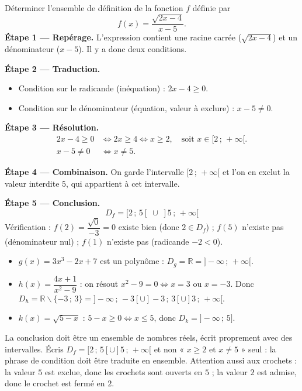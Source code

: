 \documentclass[11pt]{article}
\def\setminus{\mathbin{\backslash}}\let\smallsetminus\setminus
\begin{document}
\begin{exoresolu}
Déterminer l'ensemble de définition de la fonction $f$ définie par
\[ f(x) = \dfrac{\sqrt{2x - 4}}{x - 5}. \]
\tcblower
\textbf{Étape 1 — Repérage.} L'expression contient une racine carrée ($\sqrt{2x-4}$) et un dénominateur ($x - 5$). Il y a donc deux conditions.

\textbf{Étape 2 — Traduction.}
\begin{itemize}
\item Condition sur le radicande (inéquation) : $2x - 4 \geq 0$.
\item Condition sur le dénominateur (équation, valeur à exclure) : $x - 5 \neq 0$.
\end{itemize}

\textbf{Étape 3 — Résolution.}
\begin{align*}
2x - 4 \geq 0 &\iff 2x \geq 4 \iff x \geq 2, \quad \text{soit } x \in [2\,;\,+\infty[.\\
x - 5 \neq 0 &\iff x \neq 5.
\end{align*}

\textbf{Étape 4 — Combinaison.} On garde l'intervalle $[2\,;\,+\infty[$ et l'on en exclut la valeur interdite $5$, qui appartient à cet intervalle.

\textbf{Étape 5 — Conclusion.}
\[ \boxed{D_f = [2\,;\,5[ \;\cup\; ]5\,;\,+\infty[} \]
Vérification : $f(2) = \dfrac{\sqrt{0}}{-3} = 0$ existe bien (donc $2 \in D_f$) ; $f(5)$ n'existe pas (dénominateur nul) ; $f(1)$ n'existe pas (radicande $-2 < 0$).
\end{exoresolu}

\begin{exemplebox}
\begin{itemize}
\item $g(x) = 3x^3 - 2x + 7$ est un polynôme : $D_g = \mathbb{R} = ]-\infty\,;\,+\infty[$.
\item $h(x) = \dfrac{4x+1}{x^2-9}$ : on résout $x^2 - 9 = 0 \iff x = 3$ ou $x = -3$. Donc $D_h = \mathbb{R} \setminus \{-3\,;\,3\} = ]-\infty\,;\,-3[ \cup ]-3\,;\,3[ \cup ]3\,;\,+\infty[$.
\item $k(x) = \sqrt{5 - x}$ : $5 - x \geq 0 \iff x \leq 5$, donc $D_k = ]-\infty\,;\,5]$.
\end{itemize}
\end{exemplebox}

\begin{attention}
La conclusion doit être un ensemble de nombres réels, écrit proprement avec des intervalles. Écris $D_f = [2\,;\,5[ \cup ]5\,;\,+\infty[$ et non « $x \geq 2$ et $x \neq 5$ » seul : la phrase de condition doit être traduite en ensemble. Attention aussi aux crochets : la valeur $5$ est exclue, donc les crochets sont ouverts en $5$ ; la valeur $2$ est admise, donc le crochet est fermé en $2$.
\end{attention}
\end{document}
